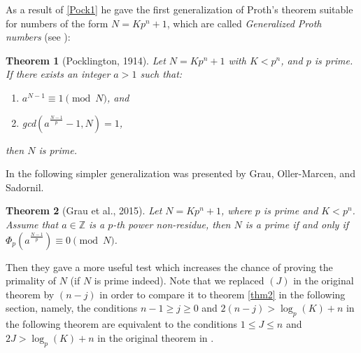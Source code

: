 \documentclass{amsart}
\newtheorem{theorem}{Theorem}[section]
\numberwithin{equation}{section}
\begin{document}

As a result of \ref{Pock1} he gave the first generalization of Proth's theorem suitable for numbers of the form $N=Kp^n+1$, which are called \emph{Generalized Proth numbers} (see \cite{Rib}): 
\begin{theorem}[Pocklington, 1914]\label{Pock3} Let $N=Kp^n+1$ with $K<p^n$, and $p$ is prime. If there exists an integer $a>1$ such that:
	\begin{enumerate}
		\item[(i)] $a^{N-1} \equiv 1 \pmod N$, and 
		\item[(ii)] gcd$(a^{\frac{N-1}{p}}-1, N)=1$,   
	\end{enumerate}
	then $N$ is prime.
\end{theorem}

In \cite{GrOMSa} the following simpler generalization was presented by Grau, Oller-Marcen, and Sadornil.

\begin{theorem}[Grau et al.,  2015]\label{GOS}
	Let $N=Kp^n+1$, where $p$ is prime and $K<p^n$. Assume that $a \in \mathbb{Z} $ is a $p$-th power non-residue, then $N$ is a prime if and only if $ \Phi_p(a^{\frac{N-1}{p}}) \equiv 0\pmod N $. 
\end{theorem} 

Then they gave a more useful test which increases the chance of proving the primality of $N$ (if $N$ is prime indeed). Note that we replaced $(J)$ in the original theorem by $(n-j)$ in order to compare it to theorem \ref{thm2} in the following section, namely, the conditions $n-1 \geq j \geq 0$ and $2(n-j) > \log_p(K)+n$ in the following theorem are equivalent to the conditions $1 \leq J \leq n$ and $2J > \log_p(K)+n$ in the original theorem in \cite{GrOMSa}. 
\end{document}
